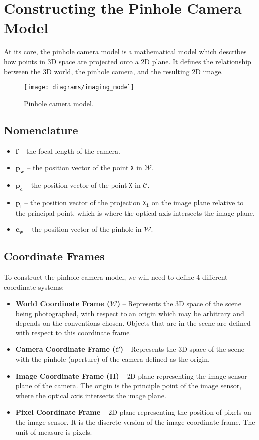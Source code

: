 \section{Constructing the Pinhole Camera Model}

At its core, the pinhole camera model is a mathematical model which describes how points in 3D space are projected onto a 2D plane. It defines the relationship between the 3D world, the pinhole camera, and the resulting 2D image. 
\begin{figure}[H]
    \centering
    \texttt{[image: diagrams/imaging\_model]}
    \caption{Pinhole camera model.}
\end{figure}

\subsection{Nomenclature}
\begin{itemize}[leftmargin=!, itemindent=-4ex]
    \item $\boldsymbol{f}$ -- the focal length of the camera.
    \item $\boldsymbol{p_w}$ -- the position vector of the point $\mathtt{X}$ in $\mathcal{W}$.
    \item $\boldsymbol{p_c}$ -- the position vector of the point $\mathtt{X}$ in $\mathcal{C}$.
    \item $\boldsymbol{p_i}$ -- the position vector of the projection $\mathtt{X_i}$ on the image plane relative to the principal point, which is where the optical axis intersects the image plane.
    \item $\boldsymbol{c_w}$ -- the position vector of the pinhole in $\mathcal{W}$.
\end{itemize}

\subsection{Coordinate Frames}
To construct the pinhole camera model, we will need to define 4 different coordinate systems: 
\begin{itemize}[leftmargin=!, itemindent=-4ex]
    \item\textbf{World Coordinate Frame ($\boldsymbol{\mathcal{W}}$)} -- Represents the 3D space of the scene being photographed, with respect to an origin which may be arbitrary and depends on the conventions chosen. Objects that are in the scene are defined with respect to this coordinate frame.
    \item\textbf{Camera Coordinate Frame ($\boldsymbol{\mathcal{C}}$)} -- Represents the 3D space of the scene with the pinhole (aperture) of the camera defined as the origin.
    \item\textbf{Image Coordinate Frame ($\boldsymbol{\Pi}$)} -- 2D plane representing the image sensor plane of the camera. The origin is the principle point of the image sensor, where the optical axis intersects the image plane.
    \item\textbf{Pixel Coordinate Frame} -- 2D plane representing the position of pixels on the image sensor. It is the discrete version of the image coordinate frame. The unit of measure is pixels.
\end{itemize}


